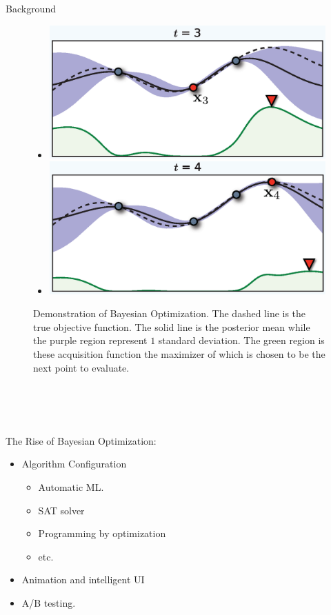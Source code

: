 \documentclass[final]{beamer}
\begin{document}
\begin{frame}[t]
\begin{columns}[T]
\begin{column}{.48\textwidth}
\begin{block}{Background}
\begin{minipage}[l]{0.37\columnwidth}
\begin{figure}
\begin{itemize}
    \item[] \includegraphics[width=0.8\columnwidth]{../Presentation/figs/bo2}
    \item[] \includegraphics[width=0.8\columnwidth]{../Presentation/figs/bo3}
   \end{itemize}
   \caption{Demonstration of Bayesian Optimization. The dashed line is the true
  objective function. The solid line is the posterior mean while the
  purple region represent $1$ standard deviation. The green region is these
  acquisition function the maximizer of which is chosen to be the next point
  to evaluate.}
  \end{figure}
  \end{minipage}
  \\~\\~\\
  \begin{minipage}[l]{0.63\columnwidth}
  The Rise of Bayesian Optimization: 
     \begin{itemize}
   \item Algorithm Configuration
   \begin{itemize}
    \item Automatic ML.
    \item SAT solver
    \item Programming by optimization
    \item etc.
   \end{itemize}
   \item Animation and intelligent UI
   \item A/B testing.

\end{itemize}
\end{minipage}
\end{block}
\end{column}
\end{columns}
\end{frame}
\end{document}
